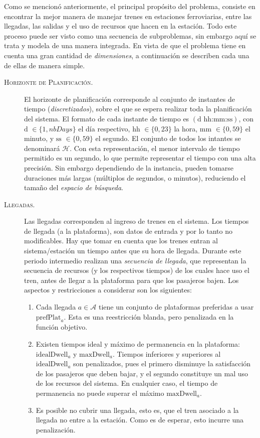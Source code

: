 \documentclass[letter, 10pt]{article}
\begin{document}
Como se mencionó anteriormente, el principal propósito del problema, consiste en encontrar la mejor
manera de manejar trenes en estaciones ferroviarias, entre las llegadas, las salidas y el uso de recursos
que hacen en la estación. Todo este proceso puede ser visto como una secuencia de subproblemas, sin embargo
aquí se trata y modela de una manera integrada. En vista de que el problema tiene en cuenta una gran 
cantidad de \textit{dimensiones}, a continuación se describen cada una de ellas de manera simple.

\begin{description}
	\item[\textsc{Horizonte de Planificación.}] 
	El horizonte de planificación corresponde al conjunto de instantes de tiempo (\textit{discretizados}),
	sobre el que se espera realizar toda la planificación del sistema. El formato de cada instante de tiempo
	es $(\text{d hh:mm:ss})$, con $\text{d } \in \{1, nbDays\}$ el día respectivo, $\text{hh } \in \{0,23\}$ 
	la hora, $\text{mm } \in \{0,59\}$ el minuto, y $\text{ss } \in \{0,59\}$ el segundo. El conjunto de todos
	los intantes se denominará $\mathcal{H}$. Con esta representación, el menor intervalo de tiempo permitido
	es un segundo, lo que permite representar el tiempo con una alta precisión. Sin embargo dependiendo de la 
	instancia, pueden tomarse duraciones más largas (múltiplos de segundos, o minutos), reduciendo el tamaño del
	\textit{espacio de búsqueda}.

	\item[\textsc{Llegadas.}]
	Las llegadas corresponden al ingreso de trenes en el sistema. Los tiempos de llegada (a la plataforma),
	son datos de entrada y por lo tanto no modificables. Hay que tomar en cuenta que los trenes entran al
	sistema/estación un tiempo antes que su hora de llegada. Durante este periodo intermedio realizan una
	\textit{secuencia de llegada}, que representan la secuencia de recursos (y los respectivos tiempos) de 
	los cuales hace uso el tren, antes de llegar a la plataforma para que los pasajeros bajen. Los aspectos
	y restricciones a considerar son los siguientes:
	\begin{enumerate}
		\item Cada llegada $a \in \mathcal{A}$ tiene un conjunto de plataformas preferidas a usar $\text{prefPlat}_a$.
		 Esta es una reestricción blanda, pero penalizada en la función objetivo.
		\item Existen tiempos ideal y máximo de permanencia en la plataforma: $\text{idealDwell}_a$ y $\text{maxDwell}_a$.
		Tiempos inferiores y superiores al $\text{idealDwell}_a$ son penalizados, pues el primero disminuye la satisfacción
		de los pasajeros que deben bajar, y el segundo constituye un mal uso de los recursos del sistema. En cualquier caso,
		el tiempo de permanencia no puede superar el máximo $\text{maxDwell}_a$.
		\item Es posible no cubrir una llegada, esto es, que el tren asociado a la llegada no entre a la estación. Como es de esperar, esto incurre una penalización.
	\end{enumerate}


\end{description}
\end{document}

